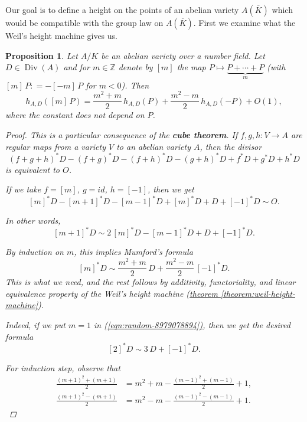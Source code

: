 \documentclass{article}
\newcommand{\refref}[2]{\hyperref[#2]{#1 \ref*{#2}}}
\newcommand{\eqnref}[1]{\hyperref[#1]{(\ref*{#1})}}
\newtheorem{proposition}{Proposition}[section]
\theoremstyle{definition}
\DeclareMathOperator{\Div}{Div}
\newcommand{\term}{\textbf}
\newcommand{\dfn}{\mathrel{\mathop:}=}
\newcommand{\ZZ}{\mathbb{Z}}
\begin{document}
Our goal is to define a height on the points of an abelian variety
$A (\overline{K})$ which would be compatible with the group law on
$A (\overline{K})$. First we examine what the Weil's height machine gives us.

\begin{proposition}
  Let $A/K$ be an abelian variety over a number field. Let $D \in \Div (A)$ and
  for $m \in \ZZ$ denote by $[m]$ the map
  $P \mapsto \underbrace{P + \cdots + P}_m$ (with $[m]\, P \dfn - [-m]\,P$ for
  $m < 0$). Then
  $$h_{A,D} ([m]\,P) = \frac{m^2+m}{2}\,h_{A,D} (P) + \frac{m^2-m}{2}\,h_{A,D} (-P) + O(1),$$
  where the constant does not depend on $P$.

  \begin{proof}
    This is a particular consequence of the \term{cube theorem}. If
    $f,g,h\colon V\to A$ are regular maps from a variety $V$ to an abelian
    variety $A$, then the divisor
    $$(f+g+h)^* D - (f+g)^* D - (f+h)^* D - (g+h)^* D + f^* D + g^* D + h^* D$$
    is equivalent to $O$.

    If we take $f = [m]$, $g = id$, $h = [-1]$, then we get
    $$[m]^* D - [m+1]^* D - [m-1]^* D + [m]^* D + D + [-1]^* D \sim O.$$

    In other words,
    \begin{equation}
      \label{eqn:random-8979078894}
      [m+1]^* D \sim 2\,[m]^* D - [m-1]^* D + D + [-1]^* D.
    \end{equation}

    By induction on $m$, this implies Mumford's formula
    \begin{equation}
      \label{eqn:5194096940}
      [m]^* D \sim \frac{m^2+m}{2}\,D + \frac{m^2-m}{2}\,[-1]^* D.
    \end{equation}
    This is what we need, and the rest follows by additivity, functoriality, and
    linear equivalence property of the Weil's height machine
    (\refref{theorem}{theorem:weil-height-machine}).

    Indeed, if we put $m = 1$ in \eqnref{eqn:random-8979078894}, then we get the
    desired formula
    $$[2]^* D \sim 3\,D + [-1]^* D.$$

    For induction step, observe that
    \begin{align*}
      \frac{(m+1)^2 + (m+1)}{2} & = m^2 + m - \frac{(m-1)^2 + (m-1)}{2}+1,\\
      \frac{(m+1)^2 - (m+1)}{2} & = m^2 - m - \frac{(m-1)^2 - (m-1)}{2}+1.
    \end{align*}


\end{proof}
\end{proposition}
\end{document}

